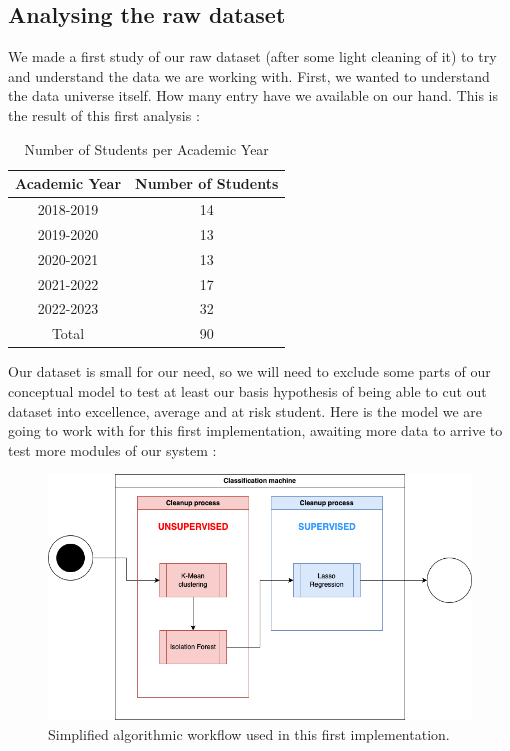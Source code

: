\documentclass[../main.tex]{subfiles}
\begin{document}
\subsection{Analysing the raw dataset}
We made a first study of our raw dataset (after some light cleaning of it) to try and understand the data we are working with. First, we wanted to understand the data universe itself. How many entry have we available on our hand. This is the result of this first analysis :
\begin{table}
  \centering
  \caption{Number of Students per Academic Year}
  \begin{tabular}{|c|c|}
    \hline
    Academic Year & Number of Students \\
    \hline
    2018-2019 & 14 \\
    2019-2020 & 13 \\
    2020-2021 & 13 \\
    2021-2022 & 17 \\
    2022-2023 & 32 \\
    \hline
    Total & 90 \\
    \hline
  \end{tabular}
  
  \label{tab:students_per_year}
\end{table}

Our dataset is small for our need, so we will need to exclude some parts of our conceptual model to test at least our basis hypothesis of being able to cut out dataset into excellence, average and at risk student.
Here is the model we are going to work with for this first implementation, awaiting more data to arrive to test more modules of our system : 

\begin{figure}      
    \includegraphics[width=1\linewidth]{res//diagram/simplifiedmdl-Imp_mdl.drawio.png}
    \caption{Simplified algorithmic workflow used in this first implementation.}
    \label{fig:dataworkflow_simp} %
\end{figure}
\end{document}
